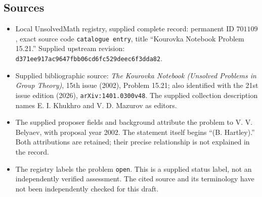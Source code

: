 \documentclass[11pt]{article}
\begin{document}
\subsection{Sources}
\begin{itemize}
\item Local UnsolvedMath registry, supplied complete record: permanent ID \(701109\), exact source code \texttt{catalogue entry}, title ``Kourovka Notebook Problem 15.21.'' Supplied upstream revision: \texttt{d371ee917ac9647fbb06cd6fc529deec6f3dda82}.
\item Supplied bibliographic source: \emph{The Kourovka Notebook (Unsolved Problems in Group Theory)}, 15th issue (2002), Problem 15.21; also identified with the 21st issue edition (2026), \texttt{arXiv:1401.0300v48}. The supplied collection description names E. I. Khukhro and V. D. Mazurov as editors.
\item The supplied proposer fields and background attribute the problem to V. V. Belyaev, with proposal year 2002. The statement itself begins ``(B. Hartley).'' Both attributions are retained; their precise relationship is not explained in the record.
\item The registry labels the problem \texttt{open}. This is a supplied status label, not an independently verified assessment. The cited source and its terminology have not been independently checked for this draft.
\end{itemize}
\end{document}
